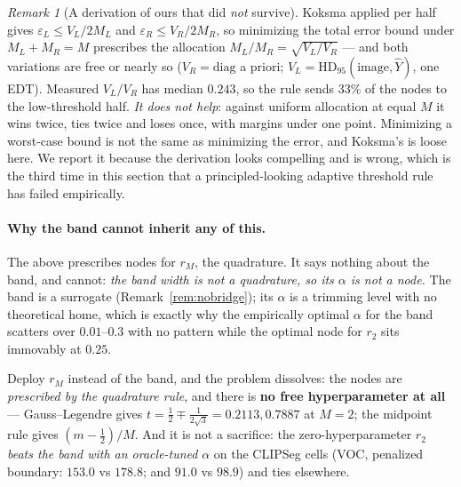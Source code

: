 \documentclass[11pt]{article}
\theoremstyle{remark}
\newtheorem{remark}{Remark}
\newcommand{\Yhat}{\widehat{Y}}
\newcommand{\HDF}{\mathrm{HD}_{95}}
\newcommand{\diag}{\mathrm{diag}}
\begin{document}
\begin{remark}[A derivation of ours that did \emph{not} survive]
Koksma applied per half gives $\varepsilon_L \le V_L/2M_L$ and
$\varepsilon_R \le V_R/2M_R$, so minimizing the total error bound under
$M_L + M_R = M$ prescribes the allocation $M_L/M_R = \sqrt{V_L/V_R}$ --- and both
variations are free or nearly so ($V_R = \diag$ a priori; $V_L = \HDF(\text{image},
\Yhat)$, one EDT). Measured $V_L/V_R$ has median $0.243$, so the rule sends $33\%$ of
the nodes to the low-threshold half. \emph{It does not help}: against uniform
allocation at equal $M$ it wins twice, ties twice and loses once, with margins under
one point. Minimizing a worst-case bound is not the same as minimizing the error, and
Koksma's is loose here. We report it because the derivation looks compelling and is
wrong, which is the third time in this section that a principled-looking adaptive
threshold rule has failed empirically.
\end{remark}

\paragraph{Why the band cannot inherit any of this.} The above prescribes nodes for
$r_M$, the quadrature. It says nothing about the band, and cannot: \emph{the band
width is not a quadrature, so its $\alpha$ is not a node.} The band is a surrogate
(Remark~\ref{rem:nobridge}); its $\alpha$ is a trimming level with no theoretical
home, which is exactly why the empirically optimal $\alpha$ for the band scatters over
$0.01$--$0.3$ with no pattern while the optimal node for $r_2$ sits immovably at
$0.25$.

Deploy $r_M$ instead of the band, and the problem dissolves: the nodes are
\emph{prescribed by the quadrature rule}, and there is \textbf{no free
hyperparameter at all} --- Gauss--Legendre gives $t = \tfrac12 \mp \tfrac{1}{2\sqrt3}
= 0.2113, 0.7887$ at $M=2$; the midpoint rule gives $(m-\tfrac12)/M$. And it is not a
sacrifice: the zero-hyperparameter $r_2$ \emph{beats the band with an oracle-tuned}
$\alpha$ on the CLIPSeg cells (VOC, penalized boundary: $153.0$ vs $178.8$; and
$91.0$ vs $98.9$) and ties elsewhere.
\end{document}

